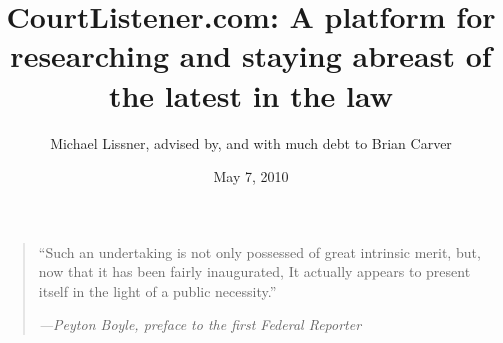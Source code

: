 \documentclass[11pt]{article}
\begin{document}
\title{CourtListener.com: A platform for researching and staying abreast of the latest in the law}

\author{Michael Lissner, advised by, and with much debt to Brian Carver}
\date{May 7, 2010}
\maketitle
\begin{quote}
``Such an undertaking is not only possessed of great intrinsic merit, but, now that it has been fairly inaugurated, It actually appears to present itself in the light of a public necessity.''

     \hspace*{10mm}\emph{---Peyton Boyle, preface to the first Federal Reporter}
\end{quote}


\clearpage
\tableofcontents
\clearpage







\clearpage

%
%
\end{document}
